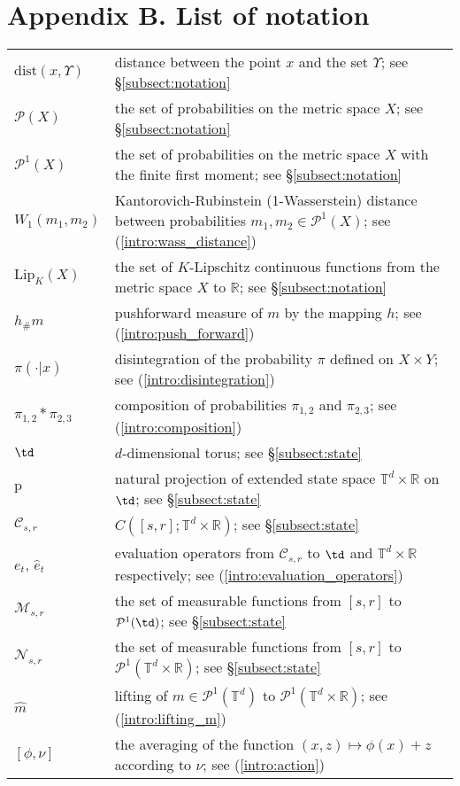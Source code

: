 \documentclass[a4paper,12pt]{article}
\newcommand{\tdr}{\mathbb{T}^{d}\times\mathbb{R}}
\newcommand{\ptd}{\mathcal{P}^1(\mathbb{T}^d)}
\begin{document}
\section*{Appendix B. List of notation}
\begin{longtable}{l p{12.0cm}}
	$\mathrm{dist}(x,\Upsilon)$ & distance between the point $x$ and the set $\Upsilon$; see \S \ref{subsect:notation}\\
	$\mathcal{P}(X)$ & the set of probabilities on the metric space $X$; see \S \ref{subsect:notation}\\
	$\mathcal{P}^1(X)$ & the set of probabilities on the metric space $X$  with the finite first moment; see \S \ref{subsect:notation}\\
	$W_1(m_1,m_2)$ & Kantorovich-Rubinstein (1-Wasserstein) distance between probabilities $m_1,m_2\in\mathcal{P}^1(X)$; see (\ref{intro:wass_distance}) \\
	$\mathrm{Lip}_K(X)$ & the set of $K$-Lipschitz continuous functions from the metric space $X$ to $\mathbb{R}$; see \S \ref{subsect:notation} \\
	$h{}_\#m$ & pushforward measure of $m$ by the mapping $h$; see  (\ref{intro:push_forward})\\
	$\pi(\cdot|x)$ & disintegration of the probability $\pi$ defined on $X\times Y$; see (\ref{intro:disintegration})\\
	$\pi_{1,2}*\pi_{2,3}$ & composition of probabilities $\pi_{1,2}$ and $\pi_{2,3}$; see (\ref{intro:composition})\\
	$\td$ & $d$-dimensional torus; see \S \ref{subsect:state}\\
	$\mathrm{p}$ & natural projection of extended state space $\tdr$ on $\td$; see \S \ref{subsect:state}\\
	$\mathcal{C}_{s,r}$ & $C([s,r];\tdr)$; see \S \ref{subsect:state} \\
	$e_t$, $\hat{e}_t$ & evaluation operators from $\mathcal{C}_{s,r}$ to $\td$ and $\tdr$ respectively; see (\ref{intro:evaluation_operators})\\
	$\mathcal{M}_{s,r}$ & the set of measurable functions from $[s,r]$ to $\mathcal{P}^1(\td)$; see \S \ref{subsect:state} \\
	$\mathcal{N}_{s,r}$ & the set of measurable functions from $[s,r]$ to $\mathcal{P}^1(\tdr)$; see \S \ref{subsect:state} \\
	$\widehat{m}$ & lifting of $m\in\ptd$ to $\mathcal{P}^1(\tdr)$; see (\ref{intro:lifting_m})\\
	$[\phi,\nu]$ & the averaging of the function $(x,z)\mapsto \phi(x)+z$ according to $\nu$; see (\ref{intro:action})\\

\end{longtable}
\end{document}

